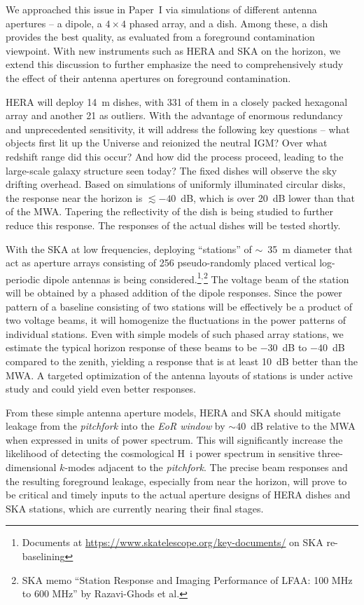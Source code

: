 \documentclass[preprint2,apjl,numberedappendix,twocolappendix,appendixfloats]{emulateapj}
\begin{document}
We approached this issue in Paper~I via simulations of different antenna apertures -- a dipole, a $4\times 4$ phased array, and a dish. Among these, a dish provides the best quality, as evaluated from a foreground contamination viewpoint. With new instruments such as HERA and SKA on the horizon, we extend this discussion to further emphasize the need to comprehensively study the effect of their antenna apertures on foreground contamination. 

HERA will deploy 14~m dishes, with 331 of them in a closely packed hexagonal array and another 21 as outliers. With the advantage of enormous redundancy and unprecedented sensitivity, it will address the following key questions -- what objects first lit up the Universe and reionized the neutral IGM? Over what redshift range did this occur? And how did the process proceed, leading to the large-scale galaxy structure seen today? The fixed dishes will observe the sky drifting overhead. Based on simulations of uniformly illuminated circular disks, the response near the horizon is $\lesssim -40$~dB, which is over 20~dB lower than that of the MWA. Tapering the reflectivity of the dish is being studied to further reduce this response. The responses of the actual dishes will be tested shortly. 

With the SKA at low frequencies, deploying ``stations'' of $\sim$~35~m diameter that act as aperture arrays consisting of 256 pseudo-randomly placed vertical log-periodic dipole antennas is being considered.\footnote{Documents at \url{https://www.skatelescope.org/key-documents/} on SKA re-baselining}$^,$\footnote{SKA memo ``Station Response and Imaging Performance of LFAA: 100 MHz to 600 MHz'' by Razavi-Ghods et al.} The voltage beam of the station will be obtained by a phased addition of the dipole responses. Since the power pattern of a baseline consisting of two stations will be effectively be a product of two voltage beams, it will homogenize the fluctuations in the power patterns of individual stations. Even with simple models of such phased array stations, we estimate the typical horizon response of these beams to be $-30$~dB to $-40$~dB compared to the zenith, yielding a response that is at least 10~dB better than the MWA. A targeted optimization of the antenna layouts of stations is under active study and could yield even better responses. 

From these simple antenna aperture models, HERA and SKA should mitigate leakage from the {\it pitchfork} into the {\it EoR window} by $\sim 40$~dB relative to the MWA when expressed in units of power spectrum. This will significantly increase the likelihood of detecting the cosmological H~{\sc i} power spectrum in sensitive three-dimensional $k$-modes adjacent to the {\it pitchfork}. The precise beam responses and the resulting foreground leakage, especially from near the horizon, will prove to be critical and timely inputs to the actual aperture designs of HERA dishes and SKA stations, which are currently nearing their final stages.
\end{document}
